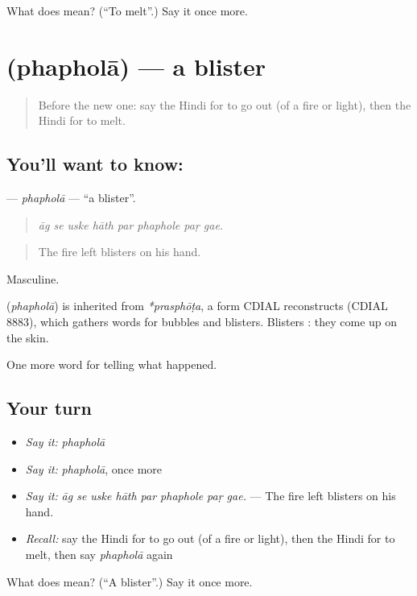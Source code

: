 \begin{tcolorbox}[breakable,colback=teal!4,colframe=teal!35!black,title={Before you move on}]
What does  mean? (\textquotedblleft{}To melt\textquotedblright{}.) Say it once more.
\end{tcolorbox}
\section[\texorpdfstring{\hi{फफोला} (phapholā)}{फफोला (phapholā)}]{ (phapholā) — a blister}

\label{lesson:HI-C301-phaphola}



\begin{quote}
Before the new one: say the Hindi for to go out (of a fire or light), then the Hindi for to melt.
\end{quote}

\subsection*{You'll want to know: }
\textbf{} — \emph{phapholā} — \textquotedblleft{}a blister\textquotedblright{}.

\begin{quote}
       
\end{quote}

\begin{quote}
\emph{āg se uske hāth par phaphole paṛ gae.}
\end{quote}

\begin{quote}
The fire left blisters on his hand.
\end{quote}

Masculine.

\begin{cousinweb}
\textbf{} (\emph{phapholā}) is inherited from \emph{*prasphōṭa}, a form CDIAL reconstructs (CDIAL 8883), which gathers words for bubbles and blisters. Blisters \textbf{ }: they come up on the skin.
\end{cousinweb}

\begin{grammarlens}[title={What you've built}]
One more word for telling what happened.
\end{grammarlens}

\subsection*{Your turn}
\begin{itemize}
\raggedright
  \item \emph{Say it:} \emph{phapholā}
  \item \emph{Say it:} \emph{phapholā}, once more
  \item \emph{Say it:} \emph{āg se uske hāth par phaphole paṛ gae.} — The fire left blisters on his hand.
  \item \emph{Recall:} say the Hindi for to go out (of a fire or light), then the Hindi for to melt, then say \emph{phapholā} again
\end{itemize}

\begin{tcolorbox}[breakable,colback=teal!4,colframe=teal!35!black,title={Before you move on}]
What does  mean? (\textquotedblleft{}A blister\textquotedblright{}.) Say it once more.
\end{tcolorbox}
